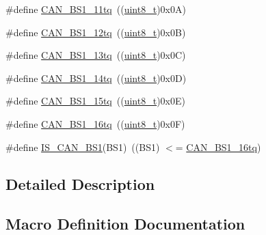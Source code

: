 \begin{DoxyCompactItemize}
\item 
\#define \hyperlink{group___c_a_n__time__quantum__in__bit__segment__1_ga4f765ffbe7fda4fb6d0fde7bc4058a14}{C\+A\+N\+\_\+\+B\+S1\+\_\+11tq}~((\hyperlink{_p_e___types_8h_aba7bc1797add20fe3efdf37ced1182c5}{uint8\+\_\+t})0x0\+A)
\item 
\#define \hyperlink{group___c_a_n__time__quantum__in__bit__segment__1_ga14c4e928f615babc14c6a9e80ee86a6c}{C\+A\+N\+\_\+\+B\+S1\+\_\+12tq}~((\hyperlink{_p_e___types_8h_aba7bc1797add20fe3efdf37ced1182c5}{uint8\+\_\+t})0x0\+B)
\item 
\#define \hyperlink{group___c_a_n__time__quantum__in__bit__segment__1_ga2087caec94be44837c1e6965da7f6236}{C\+A\+N\+\_\+\+B\+S1\+\_\+13tq}~((\hyperlink{_p_e___types_8h_aba7bc1797add20fe3efdf37ced1182c5}{uint8\+\_\+t})0x0\+C)
\item 
\#define \hyperlink{group___c_a_n__time__quantum__in__bit__segment__1_gac0c71e1020a4fbaf66bce754bd54d8cb}{C\+A\+N\+\_\+\+B\+S1\+\_\+14tq}~((\hyperlink{_p_e___types_8h_aba7bc1797add20fe3efdf37ced1182c5}{uint8\+\_\+t})0x0\+D)
\item 
\#define \hyperlink{group___c_a_n__time__quantum__in__bit__segment__1_gaa52c8674dc7caae1089e5276cd13db5f}{C\+A\+N\+\_\+\+B\+S1\+\_\+15tq}~((\hyperlink{_p_e___types_8h_aba7bc1797add20fe3efdf37ced1182c5}{uint8\+\_\+t})0x0\+E)
\item 
\#define \hyperlink{group___c_a_n__time__quantum__in__bit__segment__1_ga3be52c699f5618cc318c143ee42f5966}{C\+A\+N\+\_\+\+B\+S1\+\_\+16tq}~((\hyperlink{_p_e___types_8h_aba7bc1797add20fe3efdf37ced1182c5}{uint8\+\_\+t})0x0\+F)
\item 
\#define \hyperlink{group___c_a_n__time__quantum__in__bit__segment__1_ga225f1457e1c6b8fc3b5af0f463933152}{I\+S\+\_\+\+C\+A\+N\+\_\+\+B\+S1}(B\+S1)~((B\+S1) $<$= \hyperlink{openmotestm_2library_2inc_2stm32f10x__can_8h_a3be52c699f5618cc318c143ee42f5966}{C\+A\+N\+\_\+\+B\+S1\+\_\+16tq})
\end{DoxyCompactItemize}


\subsection{Detailed Description}


\subsection{Macro Definition Documentation}
